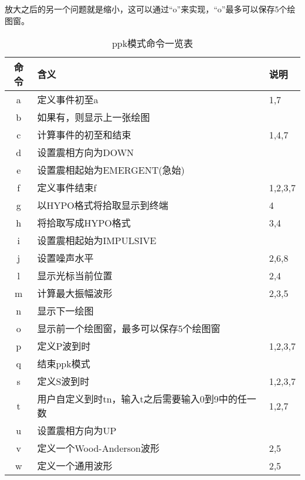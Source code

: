 放大之后的另一个问题就是缩小，这可以通过``o''来实现，``o''最多可以保存5个绘图窗。

\begin{table}[H]
\centering
\caption{ppk模式命令一览表}
\label{table:plotpk-commands}
\begin{tabular}{cll}
	\toprule
    命令	&	含义	                                &   说明    \\
	\midrule
    a	    &	定义事件初至a                           &   1,7	    \\
    b	    &	如果有，则显示上一张绘图	            &           \\
    c	    &	计算事件的初至和结束                    &   1,4,7	\\
    d	    &	设置震相方向为DOWN	                    &           \\
    e     	&	设置震相起始为EMERGENT(急始)	        &           \\
    f	    &	定义事件结束f                           &  1,2,3,7	\\
    g	    &	以HYPO格式将拾取显示到终端              &   4   	\\
    h   	&	将拾取写成HYPO格式                      &   3,4 	\\
    i	    &	设置震相起始为IMPULSIVE	                &           \\
    j	    &	设置噪声水平                            &   2,6,8	\\
    l	    &	显示光标当前位置                        &   2,4	    \\
    m	    &	计算最大振幅波形                        &   2,3,5	\\
    n	    &	显示下一绘图	                        &           \\
    o	    &	显示前一个绘图窗，最多可以保存5个绘图窗	&           \\
    p	    &	定义P波到时                             &   1,2,3,7	\\
    q	    &	结束ppk模式	                            &           \\
    s	    &	定义S波到时                             &   1,2,3,7 \\
    t	    &	用户自定义到时tn，输入t之后需要输入0到9中的任一数	&   1,2,7\\
    u	    &	设置震相方向为UP	                    &           \\
    v	    &	定义一个Wood-Anderson波形               &   2,5 	\\
    w	    &	定义一个通用波形                        &   2,5 	\\

\end{tabular}
\end{table}
